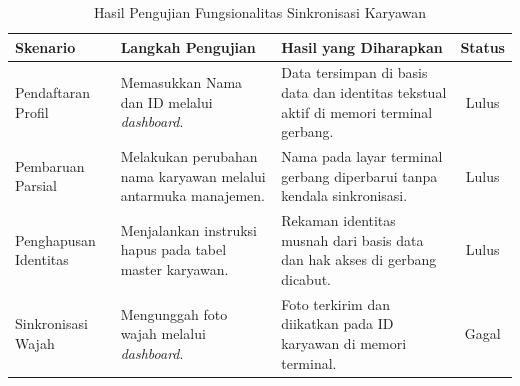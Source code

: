 \begin{table}[t]
\centering
\caption{Hasil Pengujian Fungsionalitas Sinkronisasi Karyawan}
\label{tab:test_functional}
\begin{tabular}{|l|p{4.5cm}|p{4cm}|c|}
\hline
\textbf{Skenario} & \textbf{Langkah Pengujian} & \textbf{Hasil yang Diharapkan} & \textbf{Status} \\ \hline
Pendaftaran Profil & Memasukkan Nama dan ID melalui \textit{dashboard}. & Data tersimpan di basis data dan identitas tekstual aktif di memori terminal gerbang. & Lulus \\ \hline
Pembaruan Parsial & Melakukan perubahan nama karyawan melalui antarmuka manajemen. & Nama pada layar terminal gerbang diperbarui tanpa kendala sinkronisasi. & Lulus \\ \hline
Penghapusan Identitas & Menjalankan instruksi hapus pada tabel master karyawan. & Rekaman identitas musnah dari basis data dan hak akses di gerbang dicabut. & Lulus \\ \hline
Sinkronisasi Wajah & Mengunggah foto wajah melalui \textit{dashboard}. & Foto terkirim dan diikatkan pada ID karyawan di memori terminal. & Gagal \\ \hline
\end{tabular}
\end{table}